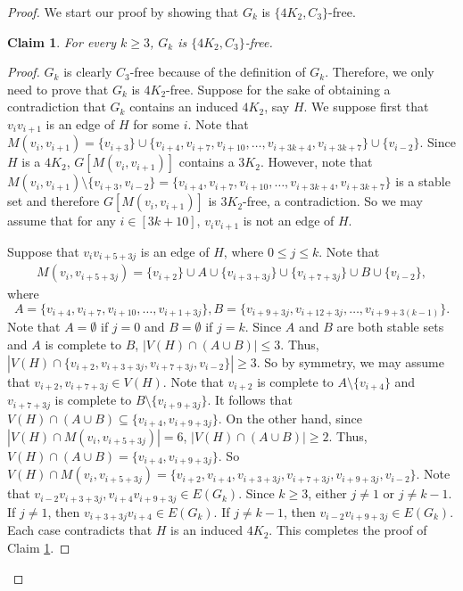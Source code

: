 \documentclass[10pt,a4paper]{amsart}
\newtheorem{claim}{Claim}
\begin{document}
\begin{proof}
    We start our proof by showing that $G_k$ is $\{4K_2,C_3\}$-free. 
    \begin{claim}\label{claim:P_11 C_3-free}
        For every $k\geq 3$, $G_k$ is $\{4K_2,C_3\}$-free. 
    \end{claim}
    \begin{proof}
        $G_k$ is clearly $C_3$-free because of the definition of $G_k$. Therefore, we only need to prove that $G_k$ is $4K_2$-free. 
        Suppose for the sake of obtaining a contradiction that $G_k$ contains an induced $4K_2$, say $H$.  
        We suppose first that $v_iv_{i+1}$ is an edge of $H$ for some $i$.  
        Note that $M(v_i,v_{i+1})=\{v_{i+3}\}\cup \{v_{i+4},v_{i+7},v_{i+10},\ldots, v_{i+3k+4}, v_{i+3k+7}\}\cup \{v_{i-2}\}$. 
        Since $H$ is a $4K_2$, $G[M(v_i,v_{i+1})]$ contains a $3K_2$. 
        However, note that $M(v_i,v_{i+1}) \setminus \{v_{i+3},v_{i-2}\} =\{v_{i+4},v_{i+7},v_{i+10},\ldots, v_{i+3k+4}, v_{i+3k+7}\}$ is a stable set and therefore $G[M(v_i,v_{i+1})]$ is $3K_2$-free, a contradiction. So we may assume that for any $i\in [3k+10]$, $v_iv_{i+1}$ is not an edge of $H$. 
        
        Suppose that $v_iv_{i+5+3j}$ is an edge of $H$, where $0\leq j\leq k$. 
        Note that  
	\begin{equation}
		\begin{aligned}
			M(v_i,v_{i+5+3j})=\{v_{i+2}\}\cup A\cup \{v_{i+3+3j}\} \cup \{v_{i+7+3j}\}\cup B\cup \{v_{i-2}\},
		\end{aligned}
	\end{equation}
	where $$A=\{v_{i+4},v_{i+7},v_{i+10},\ldots, v_{i+1+3j}\}, B=\{v_{i+9+3j},v_{i+12+3j},\ldots, v_{i+9+3(k-1)}\}.$$ 
	Note that $A=\emptyset$ if $j=0$ and $B=\emptyset$ if $j=k$. 
    Since $A$ and $B$ are both stable sets and $A$ is complete to $B$, $|V(H)\cap (A\cup B)|\leq 3$. 
	Thus, $|V(H)\cap \{v_{i+2},v_{i+3+3j},v_{i+7+3j},v_{i-2}\}|\geq 3$. 
	So by symmetry, we may assume that $v_{i+2},v_{i+7+3j}\in V(H)$. Note that $v_{i+2}$ is complete to $A\setminus \{v_{i+4}\}$ and $v_{i+7+3j}$ is complete to $B\setminus \{v_{i+9+3j}\}$. 
    It follows that $V(H)\cap (A\cup B)\subseteq \{v_{i+4},v_{i+9+3j}\}$. 
    On the other hand, since $|V(H)\cap M(v_i,v_{i+5+3j})|=6$, $|V(H)\cap (A\cup B)|\geq 2$. 
    Thus, $V(H)\cap (A\cup B)=\{v_{i+4},v_{i+9+3j}\}$. 
    So $V(H)\cap M(v_i,v_{i+5+3j})=\{v_{i+2}, v_{i+4}, v_{i+3+3j}, v_{i+7+3j}, v_{i+9+3j}, v_{i-2}\}$. 
    Note that $v_{i-2}v_{i+3+3j},v_{i+4}v_{i+9+3j}\in E(G_k)$. 
    Since $k\geq 3$, either $j\neq 1$ or $j\neq k-1$. 
    If $j\neq 1$, then $v_{i+3+3j}v_{i+4}\in E(G_k)$. 
    If $j\neq k-1$, then $v_{i-2}v_{i+9+3j}\in E(G_k)$. 
    Each case contradicts that $H$ is an induced $4K_2$. 
    This completes the proof of Claim \ref{claim:P_11 C_3-free}.
    \end{proof}


\end{proof}
\end{document}
